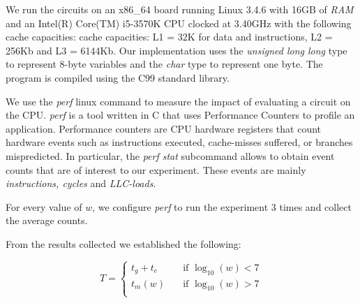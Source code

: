 \par
We run the circuits on an x86\_64 board running Linux 3.4.6 with 16GB of \textit{RAM} and an Intel(R) Core(TM) i5-3570K CPU clocked at 3.40GHz with the following cache capacities: cache capacities: L1 = 32K for data and instructions, L2 = 256Kb and L3 = 6144Kb. Our implementation uses the \textit{unsigned long long} type to represent 8-byte variables and the \textit{char} type to represent one byte. The program is compiled using the C99 standard library.
\par
We use the \textit{perf} linux command to measure the impact of evaluating a circuit on the CPU. \textit{perf} is a tool written in C that uses Performance Counters to profile an application. Performance counters are CPU hardware registers that count hardware events such as instructions executed, cache-misses suffered, or branches mispredicted\cite{perf}. In particular, the \textit{perf stat} subcommand allows to obtain event counts that are of interest to our experiment. These events are mainly \textit{instructions, cycles} and \textit{LLC-loads}.
\par
For every value of $w$, we configure \textit{perf} to run the experiment 3 times and collect the average counts.

\par
From the results collected we established the following:

\[ T =
  \begin{cases}
    t_g + t_e       & \quad \text{if } \log_{10}(w) < 7\\
    t_m(w) & \quad \text{if } \log_{10}(w) > 7\\
  \end{cases}
\]

